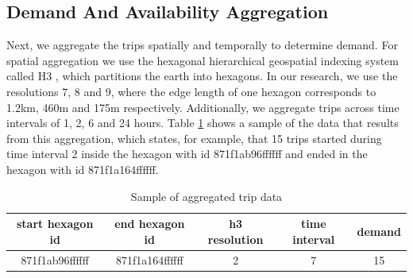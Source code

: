 \subsection{Demand And Availability Aggregation}
Next, we aggregate the trips spatially and temporally to determine demand. For spatial aggregation we use the hexagonal hierarchical geospatial indexing system called H3 , which partitions the earth into hexagons. %
In our research, we use the resolutions 7, 8 and 9, where the edge length of one hexagon corresponds to 1.2km, 460m and 175m respectively.
Additionally, we aggregate trips across time intervals of 1, 2, 6 and 24 hours. Table \ref{table:aggregated_trips} shows a sample of the data that results from this aggregation, which states, for example, that 15 trips started during time interval 2 inside the hexagon with id 871f1ab96ffffff and ended in the hexagon with id 871f1a164ffffff.

\begin{table}[h!]
    \centering
    \begin{tabular}{ |c|c|c|c|c| }
        \hline
        \textbf{start hexagon id} & \textbf{end hexagon id} & \textbf{h3 resolution} & \textbf{time interval} & \textbf{demand} \\
        \hline
        871f1ab96ffffff           & 871f1a164ffffff         & 2                      & 7                      & 15              \\
        \hline
    \end{tabular}
    \caption{Sample of aggregated trip data}
    \label{table:aggregated_trips}
\end{table}



